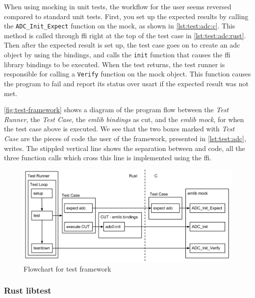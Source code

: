 When using mocking in unit tests, the workflow for the user seems reversed compared to standard unit tests.
First, you set up the expected results by calling the \texttt{ADC\_Init\_Expect} function on the mock, as shown in \autoref{lst:test:adc:c}.
This method is called through \gls{ffi} right at the top of the test case in \autoref{lst:test:adc:rust}.
Then after the expected result is set up, the test case goes on to create an \gls{adc} object by using the {\rust} bindings, and calls the \texttt{init} function that causes the \gls{ffi} library bindings to be executed.
When the test returns, the test runner is responsible for calling a \texttt{Verify} function on the mock object.
This function causes the program to fail and report its status over \gls{usart} if the expected result was not met.

\autoref{fig:test-framework} shows a diagram of the program flow between the \textit{Test Runner}, the \textit{Test Case}, the \textit{emlib bindings} as \gls{cut}, and the \textit{emlib mock}, for when the test case above is executed.
We see that the two boxes marked with \textit{Test Case} are the pieces of code the user of the framework, presented in \autoref{lst:test:adc}, writes.
The stippled vertical line shows the separation between {\rust} and {\C} code, all the three function calls which cross this line is implemented using the {\rust} \gls{ffi}.

\begin{figure}[H]
  \begin{center}
    \includegraphics[scale=0.3]{figures/testframework}
  \end{center}
  \caption{Flowchart for test framework}
  \label{fig:test-framework}
\end{figure}


\subsubsection{Rust libtest}

